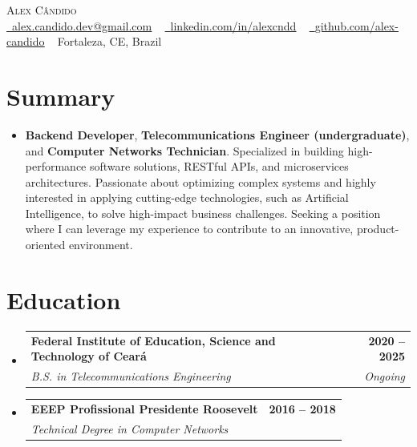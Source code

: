 \documentclass[letterpaper,11pt]{article}
\makeatletter
\newcommand{\resumeItem}[1]{
  \item\small{
    {#1 \vspace{-2pt}}
  }
}
\newcommand{\resumeSubheading}[4]{
  \vspace{-2pt}\item
    \begin{tabular*}{1.0\textwidth}[t]{l@{\extracolsep{\fill}}r}
      \textbf{#1} & \textbf{\small #2} \\
      \textit{\small#3} & \textit{\small #4} \\
    \end{tabular*}\vspace{-7pt}
}
\newcommand{\resumeSubHeadingListStart}{\begin{itemize}[leftmargin=0.0in, label={}]}
\newcommand{\resumeSubHeadingListEnd}{\end{itemize}}
\makeatother
\begin{document}
\begin{center}
    {\Huge \scshape Alex Cândido} \\ \vspace{1pt}
    \small
    \href{mailto:alex.candido.dev@gmail.com}{\raisebox{-0.2\height}
\faEnvelope\  \underline{alex.candido.dev@gmail.com}} 
    ~ 
    \href{https://www.linkedin.com/in/alexcndd/}{\raisebox{-0.2\height}
\faLinkedin\ \underline{linkedin.com/in/alexcndd}}  
    ~
    \href{https://github.com/alex-candido}{\raisebox{-0.2\height}
\faGithub\ \underline{github.com/alex-candido}}
    ~
  {\raisebox{-0.2\height}
\faMapMarker \hspace{.5pt} Fortaleza, CE, Brazil}

    \vspace{-8pt}
\end{center}


\section{Summary}
\begin{minipage}{\dimexpr\textwidth-0.2cm}
  \hspace*{0.2cm}
  \begin{minipage}{\dimexpr\textwidth}
    \resumeSubHeadingListStart
      \setlength{\itemsep}{2pt}
      \resumeItem{
        \textbf{Backend Developer}, \textbf{Telecommunications Engineer (undergraduate)}, and \textbf{Computer Networks Technician}. Specialized in building high-performance software solutions, RESTful APIs, and microservices architectures. Passionate about optimizing complex systems and highly interested in applying cutting-edge technologies, such as Artificial Intelligence, to solve high-impact business challenges. Seeking a position where I can leverage my experience to contribute to an innovative, product-oriented environment.
      }
    \resumeSubHeadingListEnd
  \end{minipage}
\end{minipage}
\vspace{10pt} 


\section{Education}
\begin{minipage}{\dimexpr\textwidth-0.2cm}
  \hspace*{0.2cm}
  \begin{minipage}{\dimexpr\textwidth}
    \resumeSubHeadingListStart
      \resumeSubheading
        {Federal Institute of Education, Science and Technology of Ceará}{2020 -- 2025}
        {B.S. in Telecommunications Engineering}{Ongoing}
      \resumeSubheading
        {EEEP Profissional Presidente Roosevelt}{2016 -- 2018}
        {Technical Degree in Computer Networks}{}
    \resumeSubHeadingListEnd
  \end{minipage}
\end{minipage}
\vspace{10pt}
\end{document}
